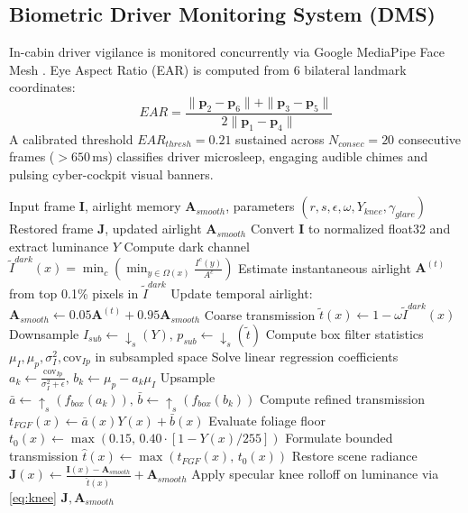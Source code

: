 \documentclass[conference]{IEEEtran}
\begin{document}
\subsection{Biometric Driver Monitoring System (DMS)}
In-cabin driver vigilance is monitored concurrently via Google MediaPipe Face Mesh \cite{kartynnik2019mediapipe}. Eye Aspect Ratio (EAR) is computed from 6 bilateral landmark coordinates:
\begin{equation}
EAR = \frac{\|\mathbf{p}_2 - \mathbf{p}_6\| + \|\mathbf{p}_3 - \mathbf{p}_5\|}{2 \|\mathbf{p}_1 - \mathbf{p}_4\|}
\label{eq:ear}
\end{equation}
A calibrated threshold $EAR_{thresh} = 0.21$ sustained across $N_{consec} = 20$ consecutive frames ($>650\,\text{ms}$) classifies driver microsleep, engaging audible chimes and pulsing cyber-cockpit visual banners.

\begin{algorithm}[t]
\caption{OmniVision Real-Time Restoration Pipeline}
\label{alg:omnivision}
\footnotesize
\begin{algorithmic}[1]
\REQUIRE Input frame $\mathbf{I}$, airlight memory $\mathbf{A}_{smooth}$, parameters $(r, s, \epsilon, \omega, Y_{knee}, \gamma_{glare})$
\ENSURE Restored frame $\mathbf{J}$, updated airlight $\mathbf{A}_{smooth}$
\STATE Convert $\mathbf{I}$ to normalized float32 and extract luminance $Y$
\STATE Compute dark channel $\tilde{I}^{dark}(x) = \min_c \left(\min_{y \in \Omega(x)} \frac{I^c(y)}{A^c}\right)$
\STATE Estimate instantaneous airlight $\mathbf{A}^{(t)}$ from top 0.1\% pixels in $\tilde{I}^{dark}$
\STATE Update temporal airlight: $\mathbf{A}_{smooth} \leftarrow 0.05 \mathbf{A}^{(t)} + 0.95 \mathbf{A}_{smooth}$
\STATE Coarse transmission $\tilde{t}(x) \leftarrow 1 - \omega \tilde{I}^{dark}(x)$
\STATE Downsample $I_{sub} \leftarrow \downarrow_s(Y), \, p_{sub} \leftarrow \downarrow_s(\tilde{t})$
\STATE Compute box filter statistics $\mu_I, \mu_p, \sigma_I^2, \text{cov}_{Ip}$ in subsampled space
\STATE Solve linear regression coefficients $a_k \leftarrow \frac{\text{cov}_{Ip}}{\sigma_I^2 + \epsilon}, \, b_k \leftarrow \mu_p - a_k \mu_I$
\STATE Upsample $\bar{a} \leftarrow \uparrow_s(f_{box}(a_k)), \, \bar{b} \leftarrow \uparrow_s(f_{box}(b_k))$
\STATE Compute refined transmission $t_{FGF}(x) \leftarrow \bar{a}(x) Y(x) + \bar{b}(x)$
\STATE Evaluate foliage floor $t_0(x) \leftarrow \max(0.15, \, 0.40 \cdot [1 - Y(x)/255])$
\STATE Formulate bounded transmission $\hat{t}(x) \leftarrow \max(t_{FGF}(x), \, t_0(x))$
\STATE Restore scene radiance $\mathbf{J}(x) \leftarrow \frac{\mathbf{I}(x) - \mathbf{A}_{smooth}}{\hat{t}(x)} + \mathbf{A}_{smooth}$
    \STATE Apply specular knee rolloff on luminance via \eqref{eq:knee}
\ENDIF
\RETURN $\mathbf{J}, \mathbf{A}_{smooth}$
\end{algorithmic}
\end{algorithm}
\end{document}
